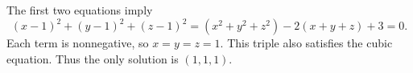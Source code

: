 The first two equations imply
\[
(x-1)^2+(y-1)^2+(z-1)^2
=(x^2+y^2+z^2)-2(x+y+z)+3=0.
\]
Each term is nonnegative, so $x=y=z=1$. This triple also satisfies the cubic equation. Thus the only solution is $\boxed{(1,1,1)}$.

